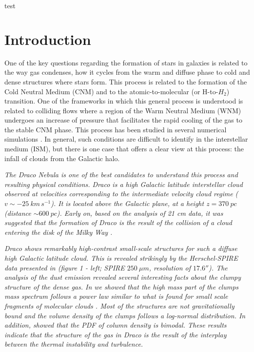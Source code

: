 \documentclass[traditabstract]{aa}
\begin{document}
test

\section{Introduction}

   One of the key questions regarding the formation of stars in galaxies is related to the way gas condenses, how it cycles from the warm and diffuse phase to cold and dense structures where stars form. This process is related to the formation of the Cold Neutral Medium (CNM) and to the atomic-to-molecular (or H-to-$H_2$) transition. One of the frameworks in which this general process is understood is related to colliding flows where a region of the Warm Neutral Medium (WNM) undergoes an increase of pressure that facilitates the rapid cooling of the gas to the stable CNM phase. This process has been studied in several numerical simulations \citep{Hennebelle_1999,Audit_2005,Vazquez_2006,Hennebelle_2007,Inoue_2009,Saury_2014}. In general, such conditions are difficult to identify in the interstellar medium (ISM), but there is one case that offers a clear view at this process: the infall of clouds from the Galactic halo.

\textit{   The Draco Nebula is one of the best candidates to understand this process and resulting physical conditions. Draco is a high Galactic latitude interstellar cloud observed at velocities corresponding to the intermediate velocity cloud regime ($v\sim -25\: km\, s^{-1}$). It is located above the Galactic plane, at a height $z=370\: pc$ (distance $\sim 600\: pc$).  Early on, based on the analysis of 21 cm data, it was suggested that the formation of Draco is the result of the collision of a cloud entering the disk of the Milky Way \citep{Goerigk_1983}.}

\textit{   Draco shows remarkably high-contrast small-scale structures for such a diffuse high Galactic latitude cloud. This is revealed strikingly by the \emph{Herschel}-SPIRE data presented in \cite{MAMD_2017b} (figure 1 - left; SPIRE $250\: \mu m$, resolution of $17.6''$).
The analysis of the dust emission revealed several interesting facts about the clumpy structure of the dense gas. In \cite{MAMD_2017b} we showed that the high mass part of the clumps mass spectrum follows a power law similar to what is found for small scale fragments of molecular clouds \cite{Peretto_2010}. Most of the structures are not gravitationally bound and the volume density of the clumps follows a log-normal distribution. In addition, \cite{Schneider_2017} showed that the PDF of column density is bimodal. These results indicate that the structure of the gas in Draco is the result of the interplay between the thermal instability and turbulence.}
\end{document}
